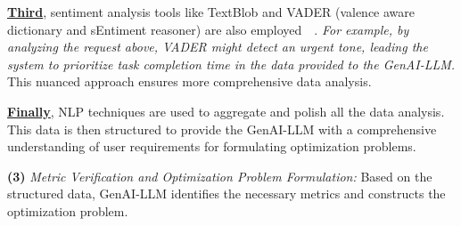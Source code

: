 \documentclass[twoside,11pt]{reviewresponse}
\theoremstyle{plain}
\theoremstyle{plain}
\begin{document}
\par \textbf{\ul{Third}}, sentiment analysis tools like TextBlob and VADER (valence aware dictionary and sEntiment reasoner) are also employed~\cite{TextBlob}~\cite{VADER}. \textit{For example, by analyzing the request above, VADER might detect an urgent tone, leading the system to prioritize task completion time in the data provided to the GenAI-LLM.} This nuanced approach ensures more comprehensive data analysis.

\par \textbf{\ul{Finally}}, NLP techniques are used to aggregate and polish all the data analysis. This data is then structured to provide the GenAI-LLM with a comprehensive understanding of user requirements for formulating optimization problems.

\par \textbf{(3)} \textit{Metric Verification and Optimization Problem Formulation:} Based on the structured data, GenAI-LLM identifies the necessary metrics and constructs the optimization problem.
\end{document}

